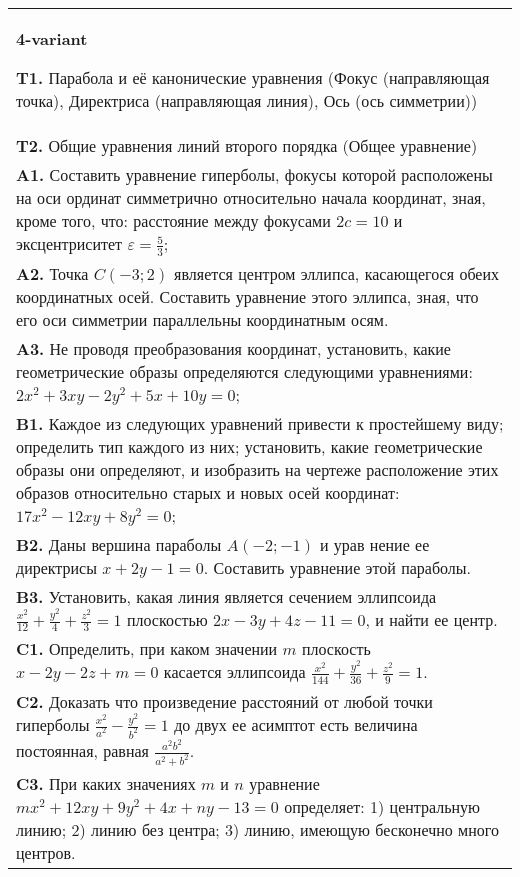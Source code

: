 \documentclass{article}
\begin{document}
\vspace{1cm}


\begin{tabular}{m{17cm}}
\textbf{4-variant}
\newline

\textbf{T1.} Парабола и её канонические уравнения (Фокус (направляющая точка), Директриса (направляющая линия), Ось (ось симметрии)) \\
\textbf{T2.} Общие уравнения линий второго порядка (Общее уравнение) \\
\textbf{A1.} Составить уравнение гиперболы, фокусы которой расположены на оси ординат симметрично относительно начала координат, зная, кроме того, что: расстояние между фокусами $2 c=10$ и эксцентриситет $\varepsilon=\frac{5}{3}$; \\
\textbf{A2.} Точка $C(-3 ; 2)$ является центром эллипса, касающегося обеих координатных осей. Составить уравнение этого эллипса, зная, что его оси симметрии параллельны координатным осям. \\
\textbf{A3.} Не проводя преобразования координат, установить, какие геометрические образы определяются следующими уравнениями: $2 x^2+3 x y-2 y^2+5 x+10 y=0$; \\
\textbf{B1.} Каждое из следующих уравнений привести к простейшему виду; определить тип каждого из них; установить, какие геометрические образы они определяют, и изобразить на чертеже расположение этих образов относительно старых и новых осей координат: $17 x^2-12 x y+8 y^2=0$; \\
\textbf{B2.} Даны вершина параболы $A(-2 ;-1)$ и урав нение ее директрисы $x+2 y-1=0$. Составить уравнение этой параболы. \\
\textbf{B3.} Установить, какая линия является сечением эллипсоида $\frac{x^2}{12}+\frac{y^2}{4}+\frac{z^2}{3}=1$ плоскостью $2 x-3 y+4 z-11=0$, и найти ее центр. \\
\textbf{C1.} Определить, при каком значении $m$ плоскость $x-2 y-2 z+m=0$ касается эллипсоида $\frac{x^2}{144}+\frac{y^2}{36}+\frac{z^2}{9}=1$. \\
\textbf{C2.} Доказать что произведение расстояний от любой точки гиперболы $\frac{x^2}{a^2}-\frac{y^2}{b^2}=1$ до двух ее асимптот есть величина постоянная, равная $\frac{a^2 b^2}{a^2+b^2}$. \\
\textbf{C3.} При каких значениях $m$ и $n$ уравнение $m x^2+12 x y+9 y^2+4 x+n y-13=0$ определяет: 1) центральную линию; 2) линию без центра; 3) линию, имеющую бесконечно много центров. \\

\end{tabular}
\vspace{1cm}
\end{document}
